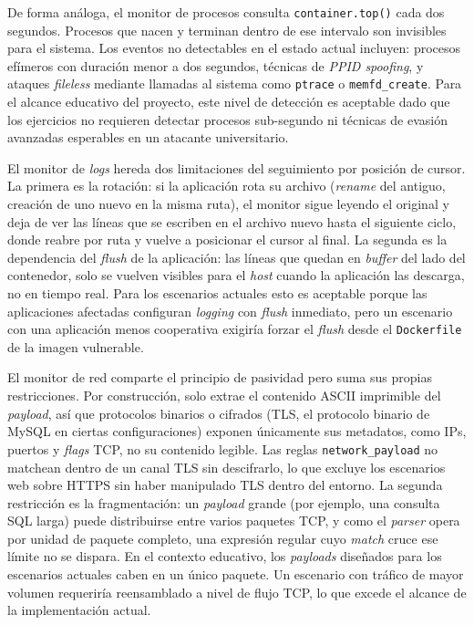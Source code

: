 De forma análoga, el monitor de procesos consulta \texttt{container.top()} cada
dos segundos. Procesos que nacen y terminan dentro de ese intervalo son
invisibles para el sistema. Los eventos no detectables en el estado actual
incluyen: procesos efímeros con duración menor a dos segundos, técnicas de
\textit{PPID spoofing}, y ataques \textit{fileless} mediante llamadas al sistema
como \texttt{ptrace} o \texttt{memfd\_create}. Para el alcance educativo del
proyecto, este nivel de detección es aceptable dado que los ejercicios no
requieren detectar procesos sub-segundo ni técnicas de evasión avanzadas
esperables en un atacante universitario.

El monitor de \textit{logs} hereda dos limitaciones del seguimiento por posición
de cursor. La primera es la rotación: si la aplicación rota su archivo
(\textit{rename} del antiguo, creación de uno nuevo en la misma ruta), el
monitor sigue leyendo el original y deja de ver las líneas que se escriben en el
archivo nuevo hasta el siguiente ciclo, donde reabre por ruta y vuelve a
posicionar el cursor al final. La segunda es la dependencia del \textit{flush}
de la aplicación: las líneas que quedan en \textit{buffer} del lado del
contenedor, solo se vuelven visibles para el \textit{host} cuando la aplicación
las descarga, no en tiempo real. Para los escenarios actuales esto es aceptable
porque las aplicaciones afectadas configuran \textit{logging} con \textit{flush}
inmediato, pero un escenario con una aplicación menos cooperativa exigiría
forzar el \textit{flush} desde el \texttt{Dockerfile} de la imagen vulnerable.

El monitor de red comparte el principio de pasividad pero suma sus propias
restricciones. Por construcción, solo extrae el contenido ASCII imprimible del
\textit{payload}, así que protocolos binarios o cifrados (TLS, el protocolo
binario de MySQL en ciertas configuraciones) exponen únicamente sus metadatos,
como IPs, puertos y \textit{flags} TCP, no su contenido legible. Las reglas
\texttt{network\_payload} no matchean dentro de un canal TLS sin descifrarlo, lo
que excluye los escenarios web sobre HTTPS sin haber manipulado TLS dentro del
entorno. La segunda restricción es la fragmentación: un \textit{payload} grande
(por ejemplo, una consulta SQL larga) puede distribuirse entre varios paquetes
TCP, y como el \textit{parser} opera por unidad de paquete completo, una
expresión regular cuyo \textit{match} cruce ese límite no se dispara. En el
contexto educativo, los \textit{payloads} diseñados para los escenarios actuales
caben en un único paquete. Un escenario con tráfico de mayor volumen requeriría
reensamblado a nivel de flujo TCP, lo que excede el alcance de la implementación
actual.

